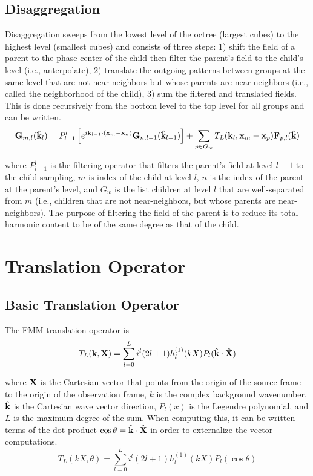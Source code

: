 \subsection{Disaggregation}

Disaggregation sweeps from the lowest level of the octree (largest cubes) to the highest level (smallest cubes) and consists of three steps: 1) shift the field of a parent to the phase center of the child then filter the parent's field to the child's level (i.e., anterpolate), 2) translate the outgoing patterns between groups at the same level that are not near-neighbors but whose parents are near-neighbors (i.e., called the neighborhood of the child), 3) sum the filtered and translated fields. This is done recursively from the bottom level to the top level for all groups and can be written. 
\begin{equation}
\mathbf{G}_{m,l}(\hat {\mathbf{k}}_{l}) = P_{l-1}^{l}\left[e^{i\mathbf{k}_{l-1} \cdot (\mathbf{x}_{m} - \mathbf{x}_{n}) }  \mathbf{G}_{n,l-1}(\hat{ \mathbf{k}}_{l-1})\right] + \sum_{p \in G_w} T_L({\mathbf{k}}_{l}, \mathbf{x}_{m} - \mathbf{x}_{p}) \mathbf{F}_{p,l}(\hat {\mathbf{k}})
\end{equation}

\noindent where $P_{l-1}^{l}$ is the filtering operator that filters the parent's field at level $l-1$ to the child sampling, $m$ is index of the child at level $l$, $n$ is the index of the parent at the parent's level, and $G_w$ is the list children at level $l$ that are well-separated from $m$ (i.e., children that are not near-neighbors, but whose parents are near-neighbors). The purpose of filtering the field of the parent is to reduce its total harmonic content to be of the same degree as that of the child. 


\section{Translation Operator}
\label{transoperator}

\subsection{Basic Translation Operator}
The FMM translation operator is 
\begin{equation}
T_L(\mathbf{k},\mathbf{X}) = \sum_{l=0}^L i^l (2l+1) h_l^{(1)} (kX) P_l(\hat{\mathbf{k}}\cdot\hat{\mathbf{X}}) 
\end{equation}

\noindent where $\mathbf{X}$ is the Cartesian vector that points from the origin of the source frame to the origin of the observation frame, $k$ is the complex background wavenumber, $\hat{\mathbf{k}}$ is the Cartesian wave vector direction, $P_l(x)$ is the Legendre polynomial, and $L$ is the maximum degree of the sum. When computing this, it can be written terms of the dot product $\cos\theta = \hat{\mathbf{k}}\cdot\hat{\mathbf{X}}$ in order to externalize the vector computations.
\begin{equation}
T_L(kX,\theta) = \sum_{l=0}^L i^l (2l+1) h_l^{(1)} (kX) P_l(\cos\theta) \label{tltheta}
\end{equation}


